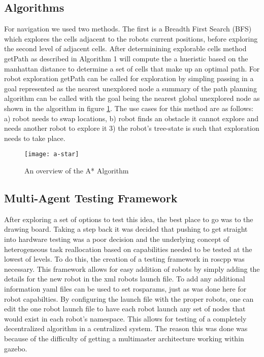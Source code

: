 \subsection{Algorithms}
For navigation we used two methods. The first is a Breadth First Search (BFS) which explores the cells adjacent to the robots
current positions, before exploring the second level of adjacent cells. After determinining explorable cells method getPath as described in Algorithm 1 will compute the a hueristic based on the manhattan distance to determine a set of cells that make up an optimal path. For robot exploration getPath can be called for exploration by simpling passing in a goal represented as the nearest unexplored node a summary of the path planning algorithm can be called with the goal being the nearest global unexplored node as shown in the algorithm in figure \ref{fig:a-star}.
 The use cases for this method are as follows: a) robot needs to swap locations, b) robot finds an obstacle it cannot explore and needs another robot to explore it 3) the robot's tree-state is such that exploration needs to take place.

 \begin{figure}[H]
   \centering
     \texttt{[image: a-star]}
   \caption{An overview of the A* Algorithm \cite{a-star}} \label{fig:a-star}
 \end{figure}




\subsection{Multi-Agent Testing Framework}

After exploring a set of options to test this idea, the best place to go was to the drawing
board. Taking a step back it was decided that pushing to get straight into hardware testing
was a poor decision and the underlying concept of heterogeneous task reallocation based on
capabilities needed to be tested at the lowest of levels. To do this, the creation of a testing
framework in roscpp was necessary. This framework allows for easy addition of robots by simply
adding the details for the new robot in the xml robots launch file. To add any additional information
yaml files can be used to set rosparams, just as was done here for robot capabilties. By configuring
the launch file with the proper robots, one can edit the one robot launch file to have each robot launch
any set of nodes that would exist in each robot's namespace. This allows for testing of a completely
decentralized algorithm in a centralized system. The reason this was done was because of the difficulty
of getting a multimaster architecture working within gazebo.
